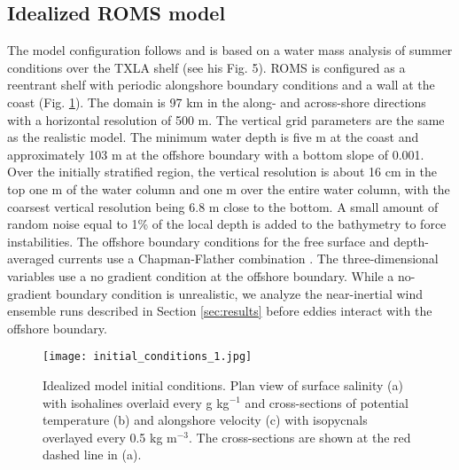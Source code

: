 \documentclass[draft]{agujournal2019}
\begin{document}
\subsection{Idealized ROMS model}
The model configuration follows  and is based on a water mass analysis of summer conditions over the TXLA shelf (see his Fig. 5). ROMS is configured as a reentrant shelf with periodic alongshore boundary conditions and a wall at the coast (Fig. \ref{fig:ideal_ics}). The domain is 97 km in the along- and across-shore directions with a horizontal resolution of 500 m. The vertical grid parameters are the same as the realistic model. The minimum water depth is five m at the coast and approximately 103 m at the offshore boundary with a bottom slope of 0.001. Over the initially stratified region, the vertical resolution is about 16 cm in the top one m of the water column and one m over the entire water column, with the coarsest vertical resolution being 6.8 m close to the bottom. A small amount of random noise equal to 1\% of the local depth is added to the bathymetry to force instabilities. The offshore boundary conditions for the free surface and depth-averaged currents use a Chapman-Flather combination \cite{chapman1985numerical,flather1976tidal}. The three-dimensional variables use a no gradient condition at the offshore boundary. While a no-gradient boundary condition is unrealistic, we analyze the near-inertial wind ensemble runs described in Section \ref{sec:results} before eddies interact with the offshore boundary. 

\begin{figure}[t]
    \begin{center}
    \texttt{[image: initial\_conditions\_1.jpg]} \\
    \caption{Idealized model initial conditions. Plan view of surface salinity (a) with isohalines overlaid every g kg$^{-1}$ and cross-sections of potential temperature (b) and alongshore velocity (c) with isopycnals overlayed every 0.5 kg m$^{-3}$. The cross-sections are shown at the red dashed line in (a).} \label{fig:ideal_ics}
     \end{center}
\end{figure}
\end{document}

